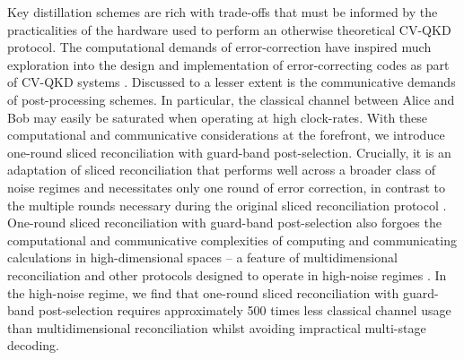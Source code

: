 ﻿\documentclass[12pt]{article}
\begin{document}
Key distillation schemes are rich with trade-offs that must be informed by the practicalities of the hardware used to perform an otherwise theoretical CV-QKD protocol. The computational demands of error-correction have inspired much exploration into the design and implementation of error-correcting codes as part of CV-QKD systems \cite{Yang-2023a}. Discussed to a lesser extent is the communicative demands of post-processing schemes. In particular, the classical channel between Alice and Bob may easily be saturated when operating at high clock-rates. With these computational and communicative considerations at the forefront, we introduce one-round sliced reconciliation with guard-band post-selection. Crucially, it is an adaptation of sliced reconciliation that performs well across a broader class of noise regimes and necessitates only one round of error correction, in contrast to the multiple rounds necessary during the original sliced reconciliation protocol \cite{VanAssche-2004}. One-round sliced reconciliation with guard-band post-selection also forgoes the computational and communicative complexities of computing and communicating calculations in high-dimensional spaces -- a feature of multidimensional reconciliation and other protocols designed to operate in high-noise regimes \cite{Leverrier-2008, Wen-2021}. In the high-noise regime, we find that one-round sliced reconciliation with guard-band post-selection requires approximately 500 times less classical channel usage than multidimensional reconciliation whilst avoiding impractical multi-stage decoding.
\end{document}
